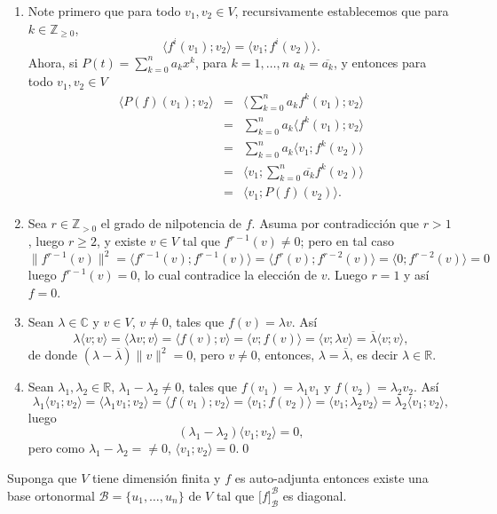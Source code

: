 \dem
\begin{enumerate}
\item Note primero que para todo $v_1,v_2\in V$, recursivamente establecemos que para $k\in\mathbb{Z}_{\ge 0}$,
\[
\langle f^i(v_1);v_2\rangle = \langle v_1;f^i(v_2)\rangle.
\]
Ahora, si $P(t)=\sum_{k=0}^na_kx^k$, para $k=1,\ldots,n$ $a_k=\overline{a_k}$, y entonces para todo $v_1,v_2\in V$
\begin{eqnarray*}
\langle P(f)(v_1);v_2 \rangle & = & \langle \sum_{k=0}^na_kf^k(v_1); v_2 \rangle\\
 & = & \sum_{k=0}^n a_k\langle f^k(v_1);v_2\rangle\\
 & = & \sum_{k=0}^n a_k\langle v_1;f^k(v_2)\rangle\\
 & = & \langle v_1;\sum_{k=0}^n\overline{a_k}f^k(v_2)\rangle\\
 & = & \langle v_1;P(f)(v_2)\rangle.
\end{eqnarray*}
\item Sea $r\in\mathbb{Z}_{>0}$ el grado de nilpotencia de $f$. Asuma por contradicci\'on que $r>1$, luego $r\ge 2$, y existe $v\in V$ tal que $f^{r-1}(v)\ne 0$; pero en tal caso
\[
\| f^{r-1}(v)\|^2=\langle f^{r-1}(v);f^{r-1}(v) \rangle=\langle f^r(v);f^{r-2}(v)\rangle=\langle 0;f^{r-2}(v)\rangle=0
\]
luego $f^{r-1}(v)=0$, lo cual contradice la elecci\'on de $v$. Luego $r=1$ y as\'i $f=0$.
\item Sean $\lambda\in\mathbb{C}$ y $v\in V$, $v\ne 0$, tales que $f(v)=\lambda v$. As\'i
\[
\lambda\langle v;v\rangle=\langle\lambda v;v\rangle=\langle f(v);v\rangle=\langle v;f(v)\rangle=\langle v;\lambda v\rangle=\overline{\lambda}\langle v;v\rangle,
\]
de donde $(\lambda-\overline{\lambda})\|v\|^2=0$, pero $v\ne 0$, entonces, $\lambda=\overline{\lambda}$, es decir $\lambda\in\mathbb{R}$.
\item Sean $\lambda_1,\lambda_2\in\mathbb{R}$, $\lambda_1-\lambda_2\ne 0$, tales que $f(v_1)=\lambda_1v_1$ y $f(v_2)=\lambda_2v_2$. As\'i
\[
\lambda_1\langle v_1;v_2\rangle=\langle\lambda_1v_1;v_2\rangle=\langle f(v_1);v_2\rangle=\langle v_1;f(v_2)\rangle=\langle v_1;\lambda_2v_2\rangle=\lambda_2\langle v_1;v_2\rangle,
\]
luego
\[
(\lambda_1-\lambda_2)\langle v_1;v_2\rangle=0,
\]
pero como $\lambda_1-\lambda_2=\ne 0$, $\langle v_1;v_2\rangle=0$.\qed
\end{enumerate}

\begin{teo} Suponga que $V$ tiene dimensi\'on finita y $f$ es auto-adjunta entonces existe una base ortonormal $\mathcal{B}=\{u_1,\ldots,u_n\}$ de $V$ tal que $\Big[f\Big]^\mathcal{B}_\mathcal{B}$ es diagonal.
\end{teo}

